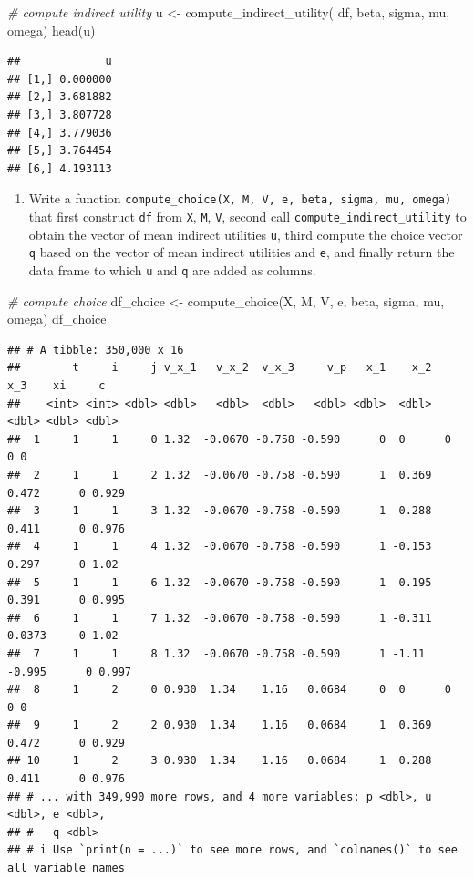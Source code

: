 \documentclass[
]{book}
\newenvironment{Shaded}{\begin{snugshade}}{\end{snugshade}}
\newcommand{\CommentTok}[1]{\textcolor[rgb]{0.56,0.35,0.01}{\textit{#1}}}
\newcommand{\FunctionTok}[1]{\textcolor[rgb]{0.00,0.00,0.00}{#1}}
\newcommand{\NormalTok}[1]{#1}
\newcommand{\OtherTok}[1]{\textcolor[rgb]{0.56,0.35,0.01}{#1}}
\providecommand{\tightlist}{%
  \setlength{\itemsep}{0pt}\setlength{\parskip}{0pt}}
\begin{document}
\begin{Shaded}
\begin{Highlighting}[]
\CommentTok{\# compute indirect utility}
\NormalTok{u }\OtherTok{\textless{}{-}} 
  \FunctionTok{compute\_indirect\_utility}\NormalTok{(}
\NormalTok{    df, beta, sigma, }
\NormalTok{           mu, omega)}
\FunctionTok{head}\NormalTok{(u)}
\end{Highlighting}
\end{Shaded}

\begin{verbatim}
##             u
## [1,] 0.000000
## [2,] 3.681882
## [3,] 3.807728
## [4,] 3.779036
## [5,] 3.764454
## [6,] 4.193113
\end{verbatim}

\begin{enumerate}
\def\labelenumi{\arabic{enumi}.}
\setcounter{enumi}{7}
\tightlist
\item
  Write a function \texttt{compute\_choice(X,\ M,\ V,\ e,\ beta,\ sigma,\ mu,\ omega)} that first construct \texttt{df} from \texttt{X}, \texttt{M}, \texttt{V}, second call \texttt{compute\_indirect\_utility} to obtain the vector of mean indirect utilities \texttt{u}, third compute the choice vector \texttt{q} based on the vector of mean indirect utilities and \texttt{e}, and finally return the data frame to which \texttt{u} and \texttt{q} are added as columns.
\end{enumerate}

\begin{Shaded}
\begin{Highlighting}[]
\CommentTok{\# compute choice}
\NormalTok{df\_choice }\OtherTok{\textless{}{-}} 
  \FunctionTok{compute\_choice}\NormalTok{(X, M, V, e, beta, sigma, }
\NormalTok{                 mu, omega)}
\NormalTok{df\_choice}
\end{Highlighting}
\end{Shaded}

\begin{verbatim}
## # A tibble: 350,000 x 16
##        t     i     j v_x_1   v_x_2  v_x_3     v_p   x_1    x_2     x_3    xi     c
##    <int> <int> <dbl> <dbl>   <dbl>  <dbl>   <dbl> <dbl>  <dbl>   <dbl> <dbl> <dbl>
##  1     1     1     0 1.32  -0.0670 -0.758 -0.590      0  0      0          0 0    
##  2     1     1     2 1.32  -0.0670 -0.758 -0.590      1  0.369  0.472      0 0.929
##  3     1     1     3 1.32  -0.0670 -0.758 -0.590      1  0.288  0.411      0 0.976
##  4     1     1     4 1.32  -0.0670 -0.758 -0.590      1 -0.153  0.297      0 1.02 
##  5     1     1     6 1.32  -0.0670 -0.758 -0.590      1  0.195  0.391      0 0.995
##  6     1     1     7 1.32  -0.0670 -0.758 -0.590      1 -0.311  0.0373     0 1.02 
##  7     1     1     8 1.32  -0.0670 -0.758 -0.590      1 -1.11  -0.995      0 0.997
##  8     1     2     0 0.930  1.34    1.16   0.0684     0  0      0          0 0    
##  9     1     2     2 0.930  1.34    1.16   0.0684     1  0.369  0.472      0 0.929
## 10     1     2     3 0.930  1.34    1.16   0.0684     1  0.288  0.411      0 0.976
## # ... with 349,990 more rows, and 4 more variables: p <dbl>, u <dbl>, e <dbl>,
## #   q <dbl>
## # i Use `print(n = ...)` to see more rows, and `colnames()` to see all variable names
\end{verbatim}
\end{document}
